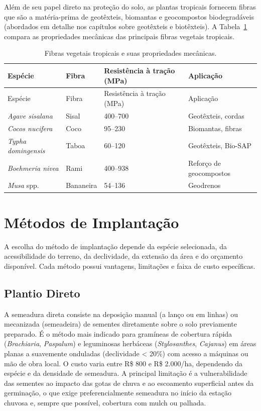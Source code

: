 \documentclass[
  portuguese,
  11pt,
  a4paper,
  open=any]{scrbook}
\begin{document}
Além de seu papel direto na proteção do solo, as plantas tropicais
fornecem fibras que são a matéria-prima de geotêxteis, biomantas e
geocompostos biodegradáveis (abordados em detalhe nos capítulos sobre
geotêxteis e biotêxteis). A Tabela~\ref{tbl-fibras} compara as
propriedades mecânicas das principais fibras vegetais tropicais.

\begin{longtable}[]{@{}llll@{}}
\caption{Fibras vegetais tropicais e suas propriedades
mecânicas.}\label{tbl-fibras}\tabularnewline
\toprule\noalign{}
Espécie & Fibra & Resistência à tração (MPa) & Aplicação \\
\midrule\noalign{}
\endfirsthead
\toprule\noalign{}
Espécie & Fibra & Resistência à tração (MPa) & Aplicação \\
\midrule\noalign{}
\endhead
\bottomrule\noalign{}
\endlastfoot
\emph{Agave sisalana} & Sisal & 400--700 & Geotêxteis, cordas \\
\emph{Cocos nucifera} & Coco & 95--230 & Biomantas, fibras \\
\emph{Typha domingensis} & Taboa & 60--120 & Geotêxteis, Bio-SAP \\
\emph{Boehmeria nivea} & Rami & 400--938 & Reforço de geocompostos \\
\emph{Musa} spp. & Bananeira & 54--136 & Geodrenos \\
\end{longtable}

\section{Métodos de Implantação}\label{muxe9todos-de-implantauxe7uxe3o}

A escolha do método de implantação depende da espécie selecionada, da
acessibilidade do terreno, da declividade, da extensão da área e do
orçamento disponível. Cada método possui vantagens, limitações e faixa
de custo específicas.

\subsection{Plantio Direto}\label{plantio-direto}

A semeadura direta consiste na deposição manual (a lanço ou em linhas)
ou mecanizada (semeadeira) de sementes diretamente sobre o solo
previamente preparado. É o método mais indicado para gramíneas de
cobertura rápida (\emph{Brachiaria}, \emph{Paspalum}) e leguminosas
herbáceas (\emph{Stylosanthes}, \emph{Cajanus}) em áreas planas a
suavemente onduladas (declividade \textless{} 20\%) com acesso a
máquinas ou mão de obra local. O custo varia entre R\$ 800 e R\$
2.000/ha, dependendo da espécie e da densidade de semeadura. A principal
limitação é a vulnerabilidade das sementes ao impacto das gotas de chuva
e ao escoamento superficial antes da germinação, o que exige
preferencialmente semeadura no início da estação chuvosa e, sempre que
possível, cobertura com mulch ou palhada.
\end{document}
